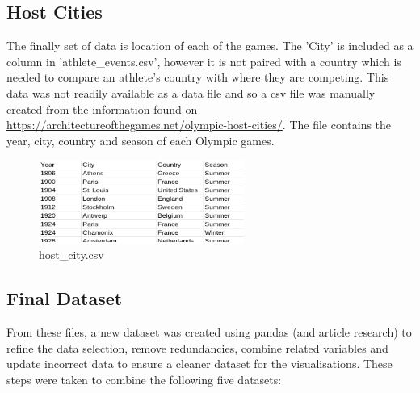 \documentclass[a4 paper, 12pt]{article}
\begin{document}
    \subsection{Host Cities}
    The finally set of data is location of each of the games. The 'City' is included as a column in 'athlete\_events.csv', however it is not paired with a country which is needed to compare an athlete's country with where they are competing. This data was not readily available as a data file and so a csv file was manually created from the information found on \url{https://architectureofthegames.net/olympic-host-cities/}. The file contains the year, city, country and season of each Olympic games. 
        \begin{figure} [H]
            \centering
            \includegraphics[width=0.6\textwidth, frame]
            {../images/host_data.png}  
            \caption{host\_city.csv}                  
        \end{figure}  

    \subsection{Final Dataset}
    From these files, a new dataset was created using pandas (and article research) to refine the data selection, remove redundancies, combine related variables and update incorrect data to ensure a cleaner dataset for the visualisations. These steps were taken to combine the following five datasets:
\end{document}
